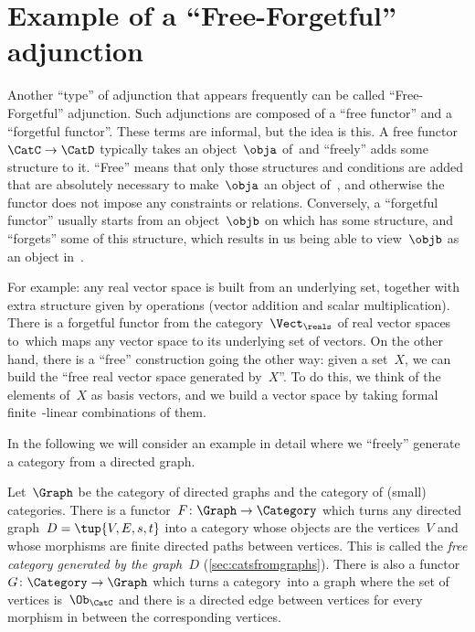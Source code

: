 \section{Example of a ``Free-Forgetful'' adjunction}

Another ``type'' of adjunction that appears frequently can be called ``Free-Forgetful'' adjunction. Such adjunctions are composed of a ``free functor'' and a ``forgetful functor''. These terms are informal, but the idea is this. A free functor~$\CatC \to \CatD$ typically takes an object~$\obja$ of~\CatC and ``freely'' adds some structure to it. ``Free'' means that only those structures and conditions are added that are absolutely necessary to make~$\obja$ an object of~\CatD, and otherwise the functor does not impose any constraints or relations. Conversely, a ``forgetful functor'' usually starts from an object~$\objb$ on \CatD which has some structure, and ``forgets'' some of this structure, which results in us being able to view~$\objb$ as an object in~\CatC.

For example: any real vector space is built from an underlying set, together with extra structure given by operations (vector addition and scalar multiplication). There is a forgetful functor from the category~$\Vect_{\reals}$ of real vector spaces to~\Set which maps any vector space to its underlying set of vectors. On the other hand, there is a ``free'' construction going the other way: given a set~$X$, we can build the ``free real vector space generated by~$X$''. To do this, we think of the elements of~$X$ as basis vectors, and we build a vector space by taking formal finite~\reals-linear combinations of them.

In the following we will consider an example in detail where we ``freely'' generate a category from a directed graph.


Let~$\Graph$ be the category of directed graphs and \Category the category of (small) categories.
There is a functor~$F \colon \Graph \to \Category$ which turns any directed graph~$D = \tup{V,E, s,t}$ into a category whose objects are the vertices~$V$ and whose morphisms are finite directed paths between vertices. This is called the \emph{free category generated by the graph~$D$} (\cref{sec:catsfromgraphs}). There is also a functor~$G \colon \Category \to \Graph$ which turns a category~\CatC into a graph where the set of vertices is~$\Ob_{\CatC}$ and there is a directed edge between vertices for every morphism in \CatC between the corresponding vertices.

